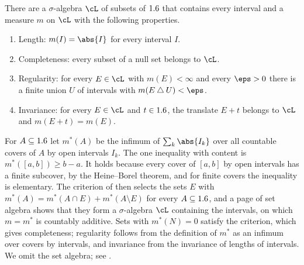 \begin{refsection}

\begin{theorem}\label{thm:lebesgue:measure}
There are a $\sigma$-algebra $\cL$ of subsets of $1.6$ that contains every interval and a measure $m$ on $\cL$ with the following properties.
\begin{enumerate}
\item Length: $m(I)=\abs{I}$ for every interval $I$.
\item Completeness: every subset of a null set belongs to $\cL$.
\item Regularity: for every $E\in\cL$ with $m(E)<\infty$ and every $\eps>0$ there is a finite union $U$ of intervals with $m(E\lebsymdiff U)<\eps$.
\item Invariance: for every $E\in\cL$ and $t\in1.6$, the translate $E+t$ belongs to $\cL$ and $m(E+t)=m(E)$.
\end{enumerate}
\end{theorem}

\begin{proofsketch}
For $A\subseteq1.6$ let $m^*(A)$ be the infimum of $\sum_k\abs{I_k}$ over all countable covers of $A$ by open intervals $I_k$. The one inequality with content is $m^*([a,b])\ge b-a$. It holds because every cover of $[a,b]$ by open intervals has a finite subcover, by the Heine--Borel theorem, and for finite covers the inequality is elementary. The criterion of \textcite{Caratheodory1914} then selects the sets $E$ with $m^*(A)=m^*(A\cap E)+m^*(A\setminus E)$ for every $A\subseteq1.6$, and a page of set algebra shows that they form a $\sigma$-algebra $\cL$ containing the intervals, on which $m=m^*$ is countably additive. Sets with $m^*(N)=0$ satisfy the criterion, which gives completeness; regularity follows from the definition of $m^*$ as an infimum over covers by intervals, and invariance from the invariance of lengths of intervals. We omit the set algebra; see \textcite[§§1.4--1.5]{Folland1999}.
\end{proofsketch}


\end{refsection}

